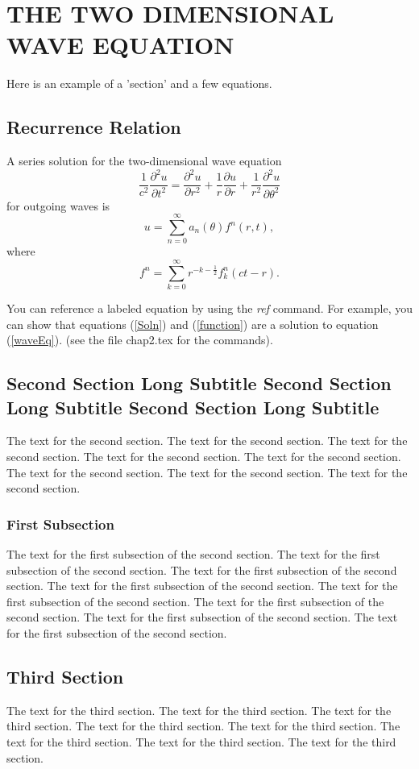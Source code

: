 \chapter{THE TWO DIMENSIONAL WAVE EQUATION} \label{2DWaveEquation}

Here is an example of a 'section' and a few equations.

\section{Recurrence Relation}

A series solution for the two-dimensional wave equation
\begin{equation}
\frac{1}{c^{2}}\frac{\partial^{2}u}{\partial t^{2}} = \frac{\partial^{2}u}{\partial r^{2}} + %
        \frac{1}{r}\frac{\partial u}{\partial r} + \frac{1}{r^{2}}\frac{\partial^{2}u}%
        {\partial\theta^{2}}                                                                 \label{waveEq}
\end{equation}
for outgoing waves is
\begin{equation}
u = \sum_{n=0}^{\infty}a_{n}(\theta)f^{n}(r,t),                                              \label{Soln}
\end{equation}
where
\begin{equation}
f^{n} = \sum_{k=0}^{\infty}r^{-k-\frac{1}{2}}f_{k}^{n}(ct-r).                                \label{function}
\end{equation} %

You can reference a labeled equation by using the \textit{ref}
command.  For example, you can show that equations (\ref{Soln}) and
(\ref{function}) are a solution to equation (\ref{waveEq}).  (see the
file chap2.tex for the commands).

\section{Second Section Long Subtitle Second Section Long Subtitle Second Section Long Subtitle}
The text for the second section.  The text for the second section.
The text for the second section.  The text for the second section.
The text for the second section.  The text for the second section.
The text for the second section.  The text for the second section.

\subsection{First Subsection}
The text for the first subsection of the second section.  The text for
the first subsection of the second section.  The text for the first
subsection of the second section.  The text for the first subsection
of the second section.  The text for the first subsection of the
second section.  The text for the first subsection of the second
section.  The text for the first subsection of the second section.
The text for the first subsection of the second section.

\section{Third Section}
The text for the third section.  The text for the third section.  The
text for the third section.  The text for the third section.  The text
for the third section.  The text for the third section.  The text for
the third section.  The text for the third section.